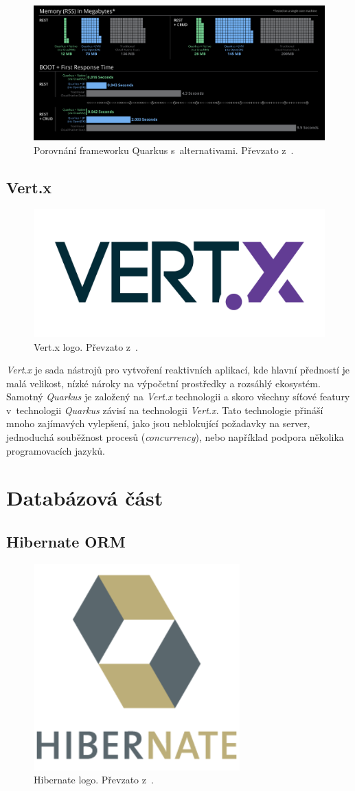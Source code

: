 \begin{figure}[hbt]
  \centering
  \includegraphics[width=1 \linewidth]{obrazky-figures/quarkus_stats.png}
  \caption{Porovnání frameworku Quarkus s~alternativami. Převzato z~\cite{quarkus:website}.}
  \label{figure:quarkus_stats}
\end{figure}

\newpage
\subsection*{Vert.x}
\label{pouzite:vertx}
\begin{figure}[hbt]
  \centering
  \includegraphics[width=.30 \linewidth]{obrazky-figures/vertx.png}
  \caption{Vert.x logo. Převzato z~\cite{wiki:vertx}.}
\end{figure}

\emph{Vert.x} je sada nástrojů pro vytvoření reaktivních aplikací, kde hlavní předností je malá velikost, nízké nároky na výpočetní prostředky a rozsáhlý ekosystém.
Samotný \emph{Quarkus} je založený na \emph{Vert.x} technologii a skoro všechny síťové featury v~technologii \emph{Quarkus} závisí na technologii \emph{Vert.x}.
Tato technologie přináší mnoho zajímavých vylepšení, jako jsou neblokující požadavky na server, jednoduchá souběžnost procesů (\emph{concurrency}), nebo například podpora několika programovacích jazyků.~\cite{wiki:vertx}

\section{Databázová část}
\label{pouzite:db}

\subsection*{Hibernate ORM}
\label{app_prostredi:hibernate}
\begin{figure}[hbt]
  \centering
  \includegraphics[width=.2 \linewidth]{obrazky-figures/hibernate.png}
  \caption{Hibernate logo. Převzato z~\cite{hibernate:logo}.}
\end{figure}

